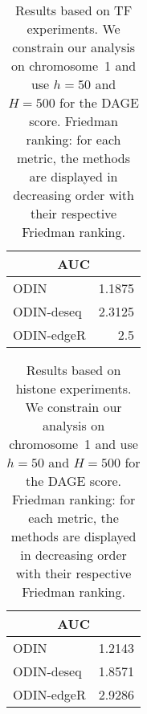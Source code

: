 \begin{table}[h!]
\begin{center}
\renewcommand{\arraystretch}{1.2}
  \begin{tabular}{ |lr| }
    \hline
    \multicolumn{2}{|c|}{\textbf{AUC}} \\
    \hline
    ODIN & 1.1875 \\
    ODIN-deseq & 2.3125 \\
    ODIN-edgeR & 2.5 \\
    \hline
  \end{tabular}
\end{center}
\caption[Friedman ranking of $p$-value estimation strategies for TF experiments]{Results based on TF experiments. We constrain our analysis on chromosome~1 and use $h=50$ and $H=500$ for the DAGE score. Friedman ranking: for each metric, the methods are displayed in decreasing order with their respective Friedman ranking.}
\label{tab_pvaluecomp_tf}
\end{table}



\begin{table}[h!]
\begin{center}
\renewcommand{\arraystretch}{1.2}
  \begin{tabular}{ |lr| }
    \hline
    \multicolumn{2}{|c|}{\textbf{AUC}} \\
    \hline
    ODIN & 1.2143 \\
    ODIN-deseq & 1.8571 \\
    ODIN-edgeR & 2.9286 \\
    \hline
  \end{tabular}
\end{center}
\caption[Friedman ranking of $p$-value estimation strategies for histone experiments]{Results based on histone experiments. We constrain our analysis on chromosome~1 and use $h=50$ and $H=500$ for the DAGE score. Friedman ranking: for each metric, the methods are displayed in decreasing order with their respective Friedman ranking.}
\label{tab_pvaluecomp_hist}
\end{table}


\clearpage


